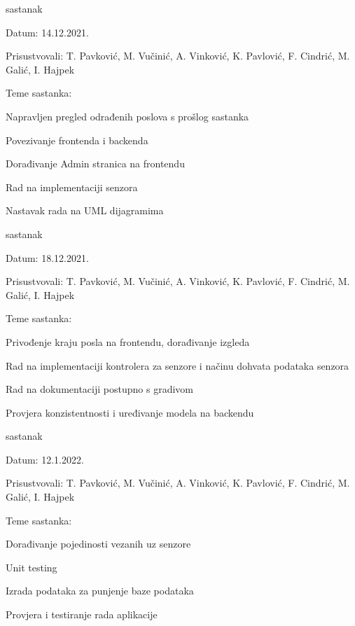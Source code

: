 \begin{packed_enum}
			\item  sastanak
			\item[] \begin{packed_item}
				\item Datum: 14.12.2021.
				\item Prisustvovali: T. Pavković, M. Vučinić, A. Vinković, K. Pavlović, F. Cindrić, M. Galić, I. Hajpek
				\item Teme sastanka:
				\begin{packed_item}
					\item  Napravljen pregled odrađenih poslova s prošlog sastanka
					\item  Povezivanje frontenda i backenda
					\item  Dorađivanje Admin stranica na frontendu
					\item  Rad na implementaciji senzora
					\item  Nastavak rada na UML dijagramima
				\end{packed_item}
			\end{packed_item}

			\item  sastanak
			\item[] \begin{packed_item}
				\item Datum: 18.12.2021.
				\item Prisustvovali: T. Pavković, M. Vučinić, A. Vinković, K. Pavlović, F. Cindrić, M. Galić, I. Hajpek
				\item Teme sastanka:
				\begin{packed_item}
					\item  Privođenje kraju posla na frontendu, dorađivanje izgleda
					\item  Rad na implementaciji kontrolera za senzore i načinu dohvata podataka senzora
					\item  Rad na dokumentaciji postupno s gradivom
					\item  Provjera konzistentnosti i uređivanje modela na backendu
				\end{packed_item}
			\end{packed_item}

			\item  sastanak
			\item[] \begin{packed_item}
				\item Datum: 12.1.2022.
				\item Prisustvovali: T. Pavković, M. Vučinić, A. Vinković, K. Pavlović, F. Cindrić, M. Galić, I. Hajpek
				\item Teme sastanka:
				\begin{packed_item}
					\item  Dorađivanje pojedinosti vezanih uz senzore
					\item  Unit testing
					\item  Izrada podataka za punjenje baze podataka
					\item  Provjera i testiranje rada aplikacije
				\end{packed_item}
			\end{packed_item}
			

\end{packed_enum}

